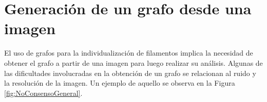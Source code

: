 \section{Generaci\'on de un grafo desde una imagen}
\label{sec:genGrafFromImage}
El uso de grafos para la individualizaci\'on de filamentos implica la necesidad de obtener el grafo a partir de una imagen para luego realizar su an\'alisis. Algunas de las dificultades involucradas en la obtenci\'on de un grafo se relacionan al ruido y la resoluci\'on de la imagen. Un ejemplo de aquello se observa en la Figura \ref{fig:NoConsensoGeneral}.

